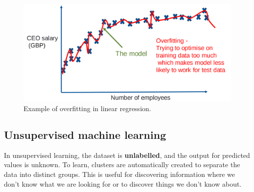 \documentclass[CS5104-Notes.tex]{subfiles}
\begin{document}
\begin{figure}[H]
\centering
\includegraphics[width=1\textwidth, keepaspectratio]{imgs/overfitting-example.png}
\caption{Example of overfitting in linear regression.}
\end{figure}

\subsection{Unsupervised machine learning}
In unsupervised learning, the dataset is \textbf{unlabelled}, and the output for predicted values is unknown. To learn, clusters are automatically created to separate the data into distinct groups. This is useful for discovering information where we don't know what we are looking for or to discover things we don't know about.
\end{document}
